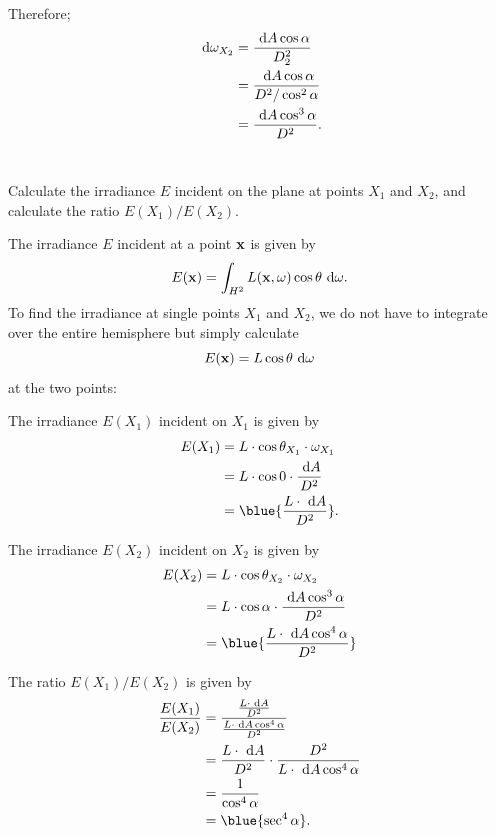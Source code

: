 \begin{problem}
\begin{enumroman}
\begin{answer}
\begin{enumarabic}
            Therefore;
            \begin{align*}
              \text{ d} \omega_{X_2} &= \frac{\text{ d} A \cos\alpha}{D_2^2} \\
              &= \frac{\text{ d} A \cos\alpha}{D^2/\cos^2\alpha} \\
              &= \frac{\text{ d} A \cos^3\alpha}{D^2}.
            \end{align*}
            ~\label{item:1.2}
        \end{enumarabic}
      \end{answer}
    \newpage
    \item Calculate the irradiance $E$ incident on the plane at points
      $X_1$ and $X_2$, and calculate the ratio $E(X_1)/E(X_2)$.
      \begin{answer}
        The irradiance $E$ incident at a point $\mathbf{x}$ is given by
        \[
          E(\mathbf{x}) = \int_{H^2} L(\mathbf{x}, \omega) \cos\theta \text{ d}\omega.
        \]
        To find the irradiance at single points $X_1$ and $X_2$,
        we do not have to integrate over the entire hemisphere
        but simply calculate
        \[
          E(\mathbf{x}) = L \cos\theta \text{ d} \omega
        \]
        at the two points:
        \begin{enumarabic}
          \item The irradiance $E(X_1)$ incident on $X_1$ is given by
            \begin{align*}
              E(X_1) &= L \cdot \cos\theta_{X_1} \cdot \omega_{X_1} \\
              &= L \cdot \cos0 \cdot \frac{\d A}{D^2} \\
              &= \blue{ \frac{L \cdot \d A}{D^2} }.
            \end{align*}
            
          \item The irradiance $E(X_2)$ incident on $X_2$ is given by
            \begin{align*}
              E(X_2) &= L \cdot \cos \theta_{X_2} \cdot \omega_{X_2} \\
              &= L \cdot \cos\alpha \cdot \frac{\d A \cos^3\alpha}{D^2} \\
              &=\blue{\frac{L \cdot \d A \cos^4\alpha}{D^2}}
            \end{align*}

          \item The ratio $E(X_1)/E(X_2)$ is given by
            \begin{align*}
              \frac{E(X_1)}{E(X_2)} &= \frac{\frac{L \cdot \d A}{D^2}}{\frac{L \cdot \d A \cos^4\alpha}{D^2}} \\
              &= \frac{L \cdot \d A}{D^2} \cdot \frac{D^2}{L \cdot \d A \cos^4\alpha} \\
              &= \frac{1}{\cos^4\alpha} \\
              &= \blue{\sec^4\alpha}.
            \end{align*}
          \end{enumarabic}
      \end{answer}
  \end{enumroman}
\end{problem}

